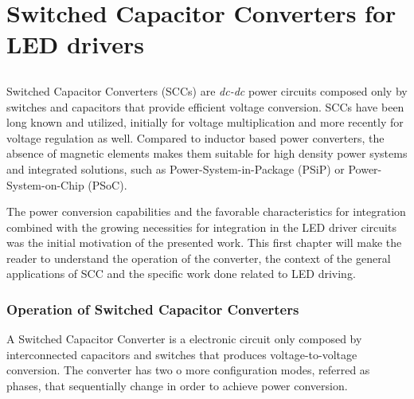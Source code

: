 \part[SCC for LED drivers]{Switched Capacitor Converters for LED drivers}
\label{ch:h_scc}

\chapter{}
Switched Capacitor Converters (SCCs) are \emph{dc-dc} power circuits composed only by switches and capacitors that provide efficient voltage conversion. SCCs have been long known and utilized, initially for voltage multiplication and more recently for voltage regulation as well. Compared to inductor based power converters, the absence of magnetic elements makes them suitable for high density power systems and integrated solutions, such as Power-System-in-Package (PSiP) or Power-System-on-Chip (PSoC). 

The power conversion capabilities and the favorable characteristics for integration combined with the growing necessities for integration in the LED driver circuits was the initial motivation of the presented work. This first chapter will make the reader to understand the operation of the converter, the context of the general applications of SCC and the specific work done related to LED driving.

\section{Operation of Switched Capacitor Converters}

A Switched Capacitor Converter is a electronic circuit only composed by interconnected capacitors and switches that produces voltage-to-voltage conversion. The converter has two o more configuration modes, referred as phases, that sequentially change in order to achieve power conversion. 

